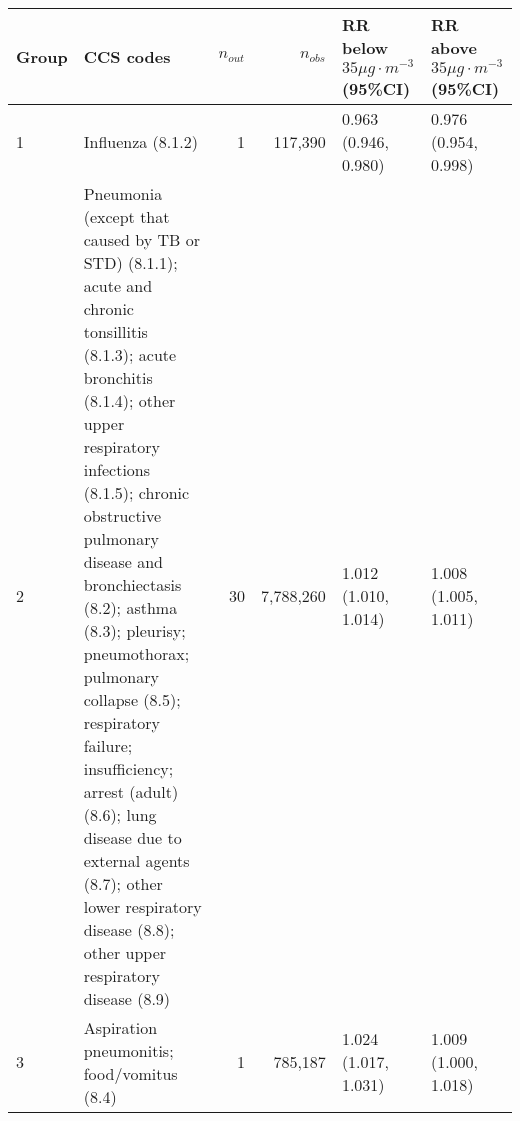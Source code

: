 \begin{tabular}{lp{6.5cm}rrp{2.2cm}p{2.2cm}}
  \hline
Group & CCS codes & $n_{out}$ & $n_{obs}$ & RR below $35 \mu g \cdot m^{-3}$ (95\%CI) & RR above $35 \mu g \cdot m^{-3}$ (95\%CI) \\ 
  \hline
   1 & Influenza (8.1.2) &    1 & 117,390 & 0.963 (0.946, 0.980) & 0.976 (0.954, 0.998) \\ 
     2 & Pneumonia (except that caused by TB or STD) (8.1.1); acute and chronic tonsillitis (8.1.3); acute bronchitis (8.1.4); other upper respiratory infections (8.1.5); chronic obstructive pulmonary disease and bronchiectasis (8.2); asthma (8.3); pleurisy; pneumothorax; pulmonary collapse (8.5); respiratory failure; insufficiency; arrest (adult) (8.6); lung disease due to external agents (8.7); other lower respiratory disease (8.8); other upper respiratory disease (8.9) &   30 & 7,788,260 & 1.012 (1.010, 1.014) & 1.008 (1.005, 1.011) \\ 
     3 & Aspiration pneumonitis; food/vomitus (8.4) &    1 & 785,187 & 1.024 (1.017, 1.031) & 1.009 (1.000, 1.018) \\ 
   \hline
\end{tabular}

